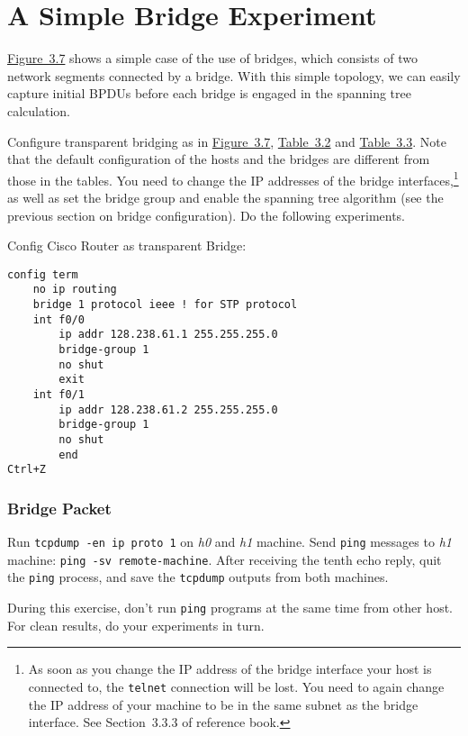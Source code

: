 \documentclass{../UTNetLab}
\begin{document}
\part{A Simple Bridge Experiment}
    \hyperref[fig:3.7]{Figure~3.7} shows a simple case of the use of bridges, which consists of two network segments connected by a bridge.
    With this simple topology, we can easily capture initial BPDUs before each bridge is engaged in the spanning tree calculation.

    Configure transparent bridging as in \hyperref[fig:3.7]{Figure~3.7}, \hyperref[tab:3.2]{Table~3.2} and \hyperref[tab:3.3]{Table~3.3}.
    Note that the default configuration of the hosts and the bridges are different from those in the tables.
    You need to change the IP addresses of the bridge interfaces,\footnote{As soon as you change the IP address of the bridge interface your host is connected to, the \lstinline{telnet} connection will be lost.
    You need to again change the IP address of your machine to be in the same subnet as the bridge interface.
    See Section~3.3.3  of reference book.} as well as set the bridge group and enable the spanning tree algorithm (see the previous section on bridge configuration).
    Do the following experiments.

    Config Cisco Router as transparent Bridge:
    \begin{lstlisting}[language={cisco}]
config term
    no ip routing
    bridge 1 protocol ieee ! for STP protocol
    int f0/0
        ip addr 128.238.61.1 255.255.255.0
        bridge-group 1
        no shut
        exit
    int f0/1
        ip addr 128.238.61.2 255.255.255.0
        bridge-group 1
        no shut
        end
Ctrl+Z
    \end{lstlisting}

\section{Bridge Packet}
    Run \lstinline{tcpdump -en ip proto 1} on \textit{h0} and \textit{h1} machine.
    Send \lstinline{ping} messages to \textit{h1} machine: \lstinline[emph={remote-machine}]{ping -sv remote-machine}.
    After receiving the tenth echo reply, quit the \lstinline{ping} process, and save the \lstinline{tcpdump} outputs from both machines.

    During this exercise, don’t run \lstinline{ping} programs at the same time from other host.
    For clean results, do your experiments in turn.
    
\end{document}
